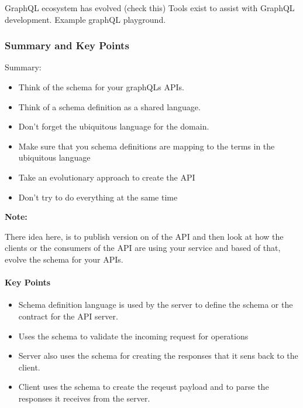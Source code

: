 \documentclass[a4paper, 11pt]{book}
\newenvironment{note}{
    \begin{siderule}
        \textbf{Note: }
        }{
    \end{siderule}
}
\begin{document}
    GraphQL ecosystem has evolved (check this)
    Tools exist to assist with GraphQL development.
    Example graphQL playground.

    \subsubsection{Summary and Key Points}
    Summary:

    \begin{itemize}
        \item Think of the schema for your graphQLs APIs.
        \item Think of a schema definition as a shared language.
        \item Don't forget the ubiquitous language for the domain.
        \item Make sure that you schema definitions are mapping to the terms in the ubiquitous language
        \item Take an evolutionary approach to create the API
        \item Don't try to do everything at the same time
    \end{itemize}

    \begin{note}
        There idea here, is to publish version on of the API and then look at how the clients or the consumers of the API are using your service and based of that, evolve the schema for your APIs.
    \end{note}

    \paragraph{Key Points}
    \begin{itemize}
        \item Schema definition language is used by the server to define the schema or the contract for the API server.
        \item Uses the schema to validate the incoming request for operations
        \item Server also uses the schema for creating the responses that it sens back to the client.
        \item Client uses the schema to create the reqeust payload and to parse the responses it receives from the server.
    \end{itemize}

\end{document}

